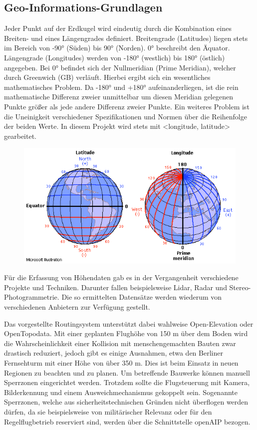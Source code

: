 \subsection*{Geo-Informations-Grundlagen}
Jeder Punkt auf der Erdkugel wird eindeutig durch die Kombination eines Breiten- und eines Längengrades definiert.
Breitengrade (Latitudes) liegen stets im Bereich von -90° (Süden) bis 90° (Norden). 0° beschreibt den Äquator.
Längengrade (Longitudes) werden von -180° (westlich) bis 180° (östlich) angegeben. Bei 0° befindet sich der Nullmeridian (Prime Meridian), welcher durch Greenwich (GB) verläuft.
Hierbei ergibt sich ein wesentliches mathematisches Problem.
Da -180° und +180° aufeinanderliegen, ist die rein mathematische Differenz zweier unmittelbar um diesen Meridian gelegenen Punkte größer als jede andere Differenz zweier Punkte.
Ein weiteres Problem ist die Uneinigkeit verschiedener Spezifikationen und Normen über die Reihenfolge der beiden Werte.
In diesem Projekt wird stets mit <longitude, latitude> gearbeitet.

\begin{figure}[h]
    \includegraphics[width=\columnwidth]{images/lat-lon-world}
\end{figure}

Für die Erfassung von Höhendaten gab es in der Vergangenheit verschiedene Projekte und Techniken.
Darunter fallen beispielsweise Lidar, Radar und Stereo-Photogrammetrie. Die so ermittelten Datensätze werden wiederum von verschiedenen Anbietern zur Verfügung gestellt.

Das vorgestellte Routingsystem unterstützt dabei wahlweise Open-Elevation oder OpenTopodata.
Mit einer geplanten Flughöhe von 150 m über dem Boden wird die Wahrscheinlichkeit einer Kollision mit menschengemachten Bauten zwar drastisch reduziert, jedoch gibt es einige Ausnahmen, etwa den Berliner Fernsehturm mit einer Höhe von über 350 m. Dies ist beim Einsatz in neuen Regionen zu beachten und zu planen. Um betreffende Bauwerke können manuell Sperrzonen eingerichtet werden. Trotzdem sollte die Flugsteuerung mit Kamera, Bilderkennung und einem Ausweichmechanismus gekoppelt sein.
Sogenannte Sperrzonen, welche aus sicherheitstechnischen Gründen nicht überflogen werden dürfen, da sie beispielsweise von militärischer Relevanz oder für den Regelflugbetrieb reserviert sind, werden über die Schnittstelle openAIP bezogen.